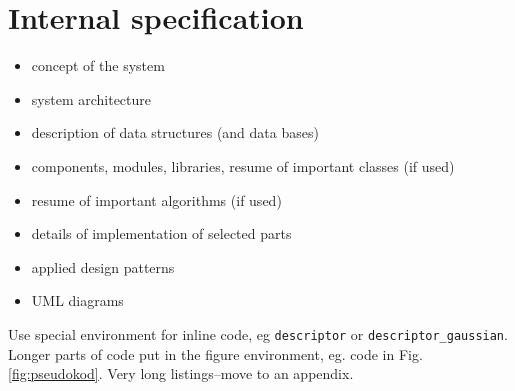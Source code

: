 \documentclass[a4paper,twoside,12pt]{book}
\begin{document}
\section{}



\chapter{Internal specification}

\begin{itemize}
\item concept of the system
\item system architecture
\item description of data structures (and data bases)
\item components, modules, libraries, resume of important classes (if used)
\item resume of important algorithms (if used)
\item details of implementation of selected parts
\item applied design patterns
\item UML diagrams
\end{itemize}


Use special environment for inline code, eg \lstinline|descriptor| or \lstinline|descriptor_gaussian|. 
Longer parts of code put in the figure environment, eg. code in Fig. \ref{fig:pseudokod}. Very long listings–move to an appendix.
\end{document}
